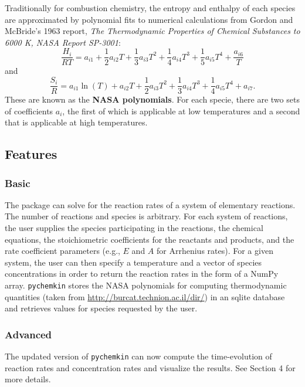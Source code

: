 \documentclass[12pt]{article}
\begin{document}
Traditionally for combustion chemistry, the entropy and enthalpy of each species are approximated by polynomial fits to numerical calculations from Gordon and McBride's 1963 report, \textit{The Thermodynamic Properties of Chemical Substances to 6000 K, NASA Report SP-3001}:
\begin{equation}
\frac{H_{i}}{RT} = a_{i1} + \frac{1}{2}a_{i2}T + \frac{1}{3}a_{i3}T^{2} + \frac{1}{4}a_{i4}T^{3} + \frac{1}{5}a_{i5}T^{4} + \frac{a_{i6}}{T}
\end{equation}
and 
\begin{equation}
\frac{S_{i}}{R} = a_{i1}\ln\left(T\right) + a_{i2}T + \frac{1}{2}a_{i3}T^{2} + \frac{1}{3}a_{i4}T^{3} + \frac{1}{4}a_{i5}T^{4} + a_{i7}.
\end{equation}
These are known as the \textbf{NASA polynomials}. For each specie, there are two sets of coefficients $a_i$, the first of which is applicable at low temperatures and a second that is applicable at high temperatures. 

\subsection{Features}
\subsubsection{Basic}
The package can solve for the reaction rates of a system of elementary reactions. The number of reactions and species is arbitrary. For each system of reactions, the user supplies the species participating in the reactions, the chemical equations, the stoichiometric coefficients for the reactants and products, and the rate coefficient parameters (e.g., $E$ and $A$ for Arrhenius rates). For a given system, the user can then specify a temperature and a vector of species concentrations in order to return the reaction rates in the form of a NumPy array. \texttt{pychemkin} stores the NASA polynomials for computing thermodynamic quantities (taken from \url{http://burcat.technion.ac.il/dir/}) in an sqlite database and retrieves values for species requested by the user. 
\subsubsection{Advanced}
The updated version of \texttt{pychemkin} can now compute the time-evolution of reaction rates and concentration rates and visualize the results. See Section 4 for more details. 
\end{document}
